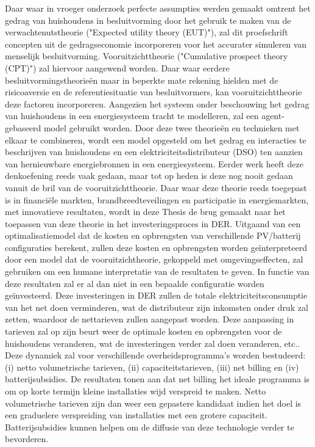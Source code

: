 \documentclass[master=ene,english]{kulemt}
\begin{document}
\begin{abstract*}
 Daar waar in vroeger onderzoek perfecte assumpties werden gemaakt omtrent het gedrag van huishoudens in besluitvorming door het gebruik te maken van de verwachtenutstheorie ("Expected utility theory (EUT)"), zal dit proefschrift concepten uit de gedragseconomie incorporeren voor het accurater simuleren van menselijk besluitvorming. Vooruitzichttheorie ("Cumulative prospect theory (CPT)") zal hiervoor aangewend worden. Daar waar eerdere besluitvormingstheorie\"{e}n maar in beperkte mate rekening hielden met de risicoaversie en de referentiesituatie van besluitvormers, kan vooruitzichttheorie deze factoren incorporeren. Aangezien het systeem onder beschouwing het gedrag van huishoudens in een energiesysteem tracht te modelleren, zal een agent-gebaseerd model gebruikt worden. Door deze twee theorie\"{e}n en technieken met elkaar te combineren, wordt een model opgesteld om het gedrag en interacties te beschrijven van huishoudens en een elektriciteitsdistributeur (DSO) ten aanzien van hernieuwbare energiebronnen in een energiesysteem. Eerder werk heeft deze denkoefening reeds vaak gedaan, maar tot op heden is deze nog nooit gedaan vanuit de bril van de vooruitzichttheorie. Daar waar deze theorie reeds toegepast is in financi\"{e}le markten, brandbreedteveilingen en participatie in energiemarkten, met innovatieve resultaten, wordt in deze Thesis de brug gemaakt naar het toepassen van deze theorie in het investeringsproces in DER.
  \newline \noindent
 Uitgaand van een optimalisatiemodel dat de kosten en opbrengsten van verschillende PV/batterij configuraties berekent, zullen deze kosten en opbrengsten worden ge\"{i}nterpreteerd door een model dat de vooruitzichtheorie, gekoppeld met omgevingseffecten, zal gebruiken om een humane  interpretatie van de resultaten te geven. In functie van deze resultaten zal er al dan niet in een bepaalde configuratie worden ge\"{i}nvesteerd. Deze investeringen in DER zullen de totale elektriciteitsconsumptie van het net doen verminderen, wat de distributeur zijn inkomsten onder druk zal zetten, waardoor de nettarieven zullen aangepast worden. Deze aanpassing in tarieven zal op zijn beurt weer de optimale kosten en opbrengsten voor de huishoudens veranderen, wat de investeringen verder zal doen veranderen, etc.. Deze dynamiek zal voor verschillende overheidsprogramma's worden bestudeerd: (i) netto volumetrische tarieven, (ii) capaciteitstarieven, (iii) net billing en (iv) batterijsubsidies. De resultaten tonen aan dat net billing het ideale programma is om op korte termijn kleine installaties wijd verspreid te maken. Netto volumetrische tarieven zijn dan weer een gepastere kandidaat indien het doel is een graduelere verspreiding van installaties met een grotere capaciteit. Batterijsubsidies kunnen helpen om de diffusie van deze technologie verder te bevorderen. 

\end{abstract*}
\end{document}
